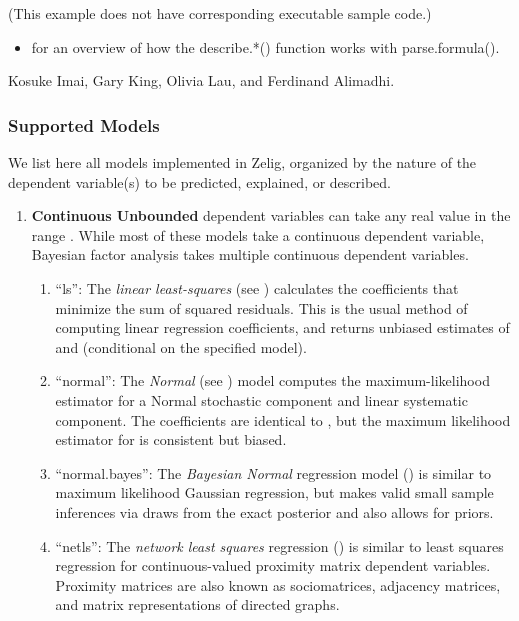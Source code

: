 \documentclass[letterpaper,10pt,english]{sphinxmanual}
\begin{document}
(This example does not have corresponding executable sample code.)
\begin{itemize}
\item {} 
for an overview of how the describe.*() function works with
parse.formula().

\end{itemize}

Kosuke Imai, Gary King, Olivia Lau, and Ferdinand Alimadhi.


\subsubsection{Supported Models}
\label{docs/user_guide:supported-models}
We list here all models implemented in Zelig, organized by the nature of
the dependent variable(s) to be predicted, explained, or described.
\begin{enumerate}
\item {} 
\textbf{Continuous Unbounded} dependent variables can take any real value
in the range . While most of these models
take a continuous dependent variable, Bayesian factor analysis takes
multiple continuous dependent variables.
\begin{enumerate}
\item {} 
“ls”: The \emph{linear least-squares} (see ) calculates the
coefficients that minimize the sum of squared residuals. This is
the usual method of computing linear regression coefficients, and
returns unbiased estimates of  and 
(conditional on the specified model).

\item {} 
“normal”: The \emph{Normal} (see ) model computes the
maximum-likelihood estimator for a Normal stochastic component and
linear systematic component. The coefficients are identical to
, but the maximum likelihood estimator for 
is consistent but biased.

\item {} 
“normal.bayes”: The \emph{Bayesian Normal} regression model () is
similar to maximum likelihood Gaussian regression, but makes valid
small sample inferences via draws from the exact posterior and
also allows for priors.

\item {} 
“netls”: The \emph{network least squares} regression () is similar to
least squares regression for continuous-valued proximity matrix
dependent variables. Proximity matrices are also known as
sociomatrices, adjacency matrices, and matrix representations of
directed graphs.


\end{enumerate}
\end{enumerate}
\end{document}
